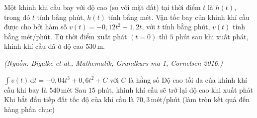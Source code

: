 %

\begin{ex}%
	Một khinh khi cầu bay với độ cao (so với mặt đất) tại thời điểm $t$ là $h(t)$, trong đó $t$ tính bằng phút, $h(t)$ tính bằng mét. Vận tốc bay của khinh khí cầu được cho bởi hàm số $v(t)=-0{,}12t^2+1{,}2t$, với $t$ tính bằng phút, $v(t)$ tính bằng mét/phút. Từ thời điểm xuất phát $(t=0)$ thì $5$ phút sau khi xuất phát, khinh khí cầu đã ở độ cao $530$\,m.
	\begin{flushright}
		\textit{(Nguồn: Bigalke et al., Mathematik, Grundkurs ma-1, Cornelsen 2016.)}
	\end{flushright}
	\choiceTF
	{\True $\displaystyle\int v(t)\mathrm{\,d}t=-0{,}04t^3+0{,}6t^2+C$ với $C$ là hằng số}
	{\True Độ cao tối đa của khinh khí cầu khi bay là $540$\,mét}
	{\True Sau $15$ phút, khinh khí cầu sẽ trở lại độ cao khi xuất phát}
	{Khi bắt đầu tiếp đất tốc độ của khí cầu là $70{,}3$\,mét/phút (làm tròn kết quả đến hàng phần chục)}
\end{ex}

